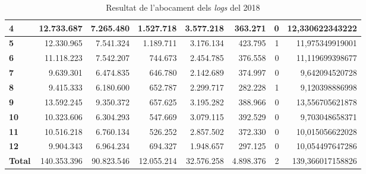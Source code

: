\begin{table}[h!]
\begin{adjustbox}{width=1.5\textwidth, center}
\begin{tabular}{|l|r|r|r|r|r|r|r|}
            \textbf{4}     & 12.733.687  & 7.265.480  & 1.527.718  & 3.577.218  & 363.271   & 0 & 12,330622343222  \\
            \midrule
            \textbf{5}     & 12.330.965  & 7.541.324  & 1.189.711  & 3.176.134  & 423.795   & 1 & 11,975349919001  \\
            \textbf{6}     & 11.118.223  & 7.542.207  & 744.673    & 2.454.785  & 376.558   & 0 & 11,119699398677  \\
            \textbf{7}     & 9.639.301   & 6.474.835  & 646.780    & 2.142.689  & 374.997   & 0 & 9,642094520728   \\
            \textbf{8}     & 9.415.333   & 6.180.600  & 652.787    & 2.299.717  & 282.228   & 1 & 9,120398886998   \\
            \midrule
            \textbf{9}     & 13.592.245  & 9.350.372  & 657.625    & 3.195.282  & 388.966   & 0 & 13,556705621878  \\
            \textbf{10}    & 10.323.606  & 6.304.293  & 547.669    & 3.079.115  & 392.529   & 0 & 9,703048658371   \\
            \textbf{11}    & 10.516.218  & 6.760.134  & 526.252    & 2.857.502  & 372.330   & 0 & 10,015056622028  \\
            \textbf{12}    & 9.904.343   & 6.964.234  & 694.327    & 1.948.657  & 297.125   & 0 & 10,054497647286  \\
            \midrule
            \textbf{Total} & 140.353.396 & 90.823.546 & 12.055.214 & 32.576.258 & 4.898.376 & 2 & 139,366017158826 \\
            \bottomrule
        \end{tabular}
    \end{adjustbox}
    \caption{Resultat de l'abocament dels \textit{logs} del 2018}
    \label{tab:logs-table-2018}
\end{table}
